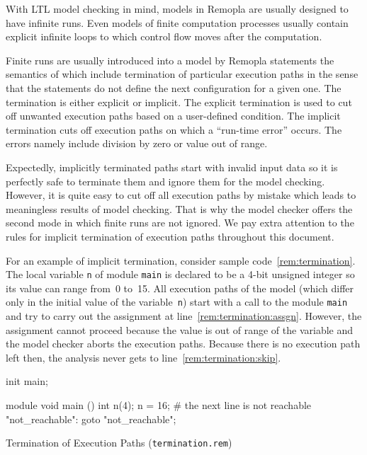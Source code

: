 \documentclass[a4paper,11pt,titlepage,english]{article}
\begin{document}
With LTL model checking in mind, models in Remopla are usually designed to
have infinite runs. Even models of finite computation processes usually
contain explicit infinite loops to which control flow moves after the
computation.

Finite runs are usually introduced into a model by Remopla statements the
semantics of which include termination of particular execution paths in the
sense that the statements do not define the next configuration for a given
one. The termination is either explicit or implicit. The explicit
termination is used to cut off unwanted execution paths based on
a user-defined condition. The implicit termination cuts off execution paths
on which a ``run-time error'' occurs. The errors namely include division by
zero or value out of range. 

Expectedly, implicitly terminated paths start with invalid input data so
it is perfectly safe to terminate them and ignore them for the model
checking. However, it is quite easy to cut off all execution paths by
mistake which leads to meaningless results of model checking.  That is why
the model checker offers the second mode in which finite runs are not
ignored. We pay extra attention to the rules for implicit termination of
execution paths throughout this document.

For an example of implicit termination, consider sample
code~\ref{rem:termination}. The local variable \verb|n| of module
\verb|main| is declared to be a 4-bit unsigned integer so its value can
range from~0 to~15. All execution paths of the model (which differ only in
the initial value of the variable~\verb|n|) start with a call to the
module \verb|main| and try to carry out the assignment at
line~\ref{rem:termination:assgn}.  However, the assignment cannot proceed
because the value is out of range of the variable and the model checker
aborts the execution paths. Because there is no execution path left then,
the analysis never gets to line~\ref{rem:termination:skip}.

\begin{SampleCode}
\begin{RemoplaCode}
    init main;
    
    module void main () {
        int n(4);
        n = 16;\label{rem:termination:assgn}
        # the next line is not reachable
        "not_reachable":  goto "not_reachable";\label{rem:termination:skip} 
    }
\end{RemoplaCode}
\caption{Termination of Execution Paths
(\texttt{termination.rem})\label{rem:termination}}
\end{SampleCode}
\end{document}
